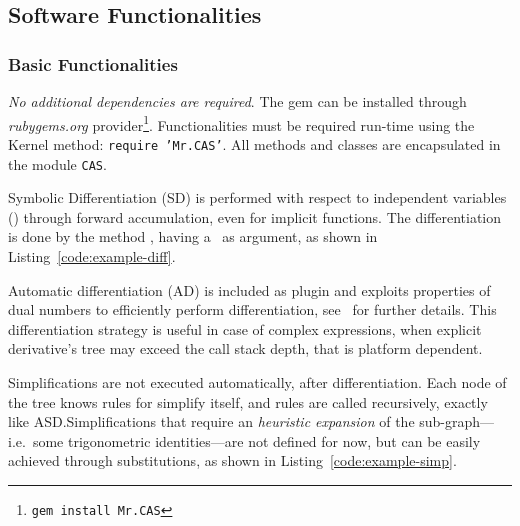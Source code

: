 \subsection{Software Functionalities}
\label{sec:functionalities}

\subsubsection{Basic Functionalities}

\emph{No additional dependencies are required}. The gem can be installed through \emph{rubygems.org} provider\footnote{\texttt{gem install Mr.CAS}}. Functionalities must be required run-time using the Kernel method: \texttt{require 'Mr.CAS'}. All methods and classes are encapsulated in the module \texttt{CAS}.


Symbolic Differentiation (SD) is performed with respect to independent variables (\CASVariable) through forward accumulation, even for implicit functions. The differentiation is done by the method \CASOpdiff, having a \CASVariable~as argument, as shown in Listing~\ref{code:example-diff}.

\noindent%


Automatic differentiation (AD) is included as plugin and exploits properties of dual numbers to efficiently perform differentiation, see~\cite{bartholomew2000automatic} for further details. This differentiation strategy is useful in case of complex expressions, when explicit derivative's tree may exceed the call stack depth, that is platform dependent.

Simplifications are not executed automatically, after differentiation. Each node of the tree knows rules for simplify itself, and rules are called recursively, exactly like ASD.\@ Simplifications that require an \emph{heuristic expansion} of the sub-graph---i.e.\ some trigonometric identities---are not defined for now, but can be easily achieved through substitutions, as shown in Listing~\ref{code:example-simp}.

